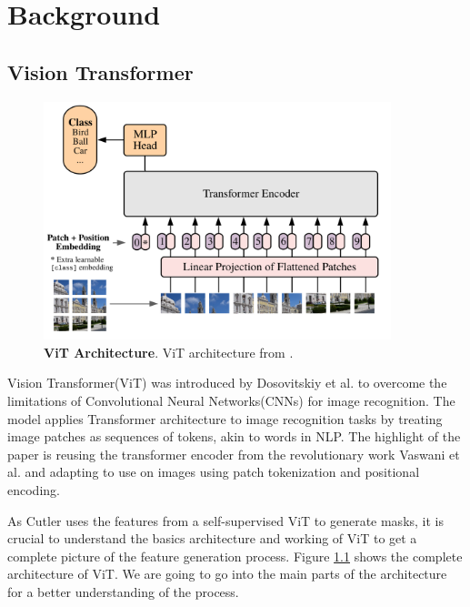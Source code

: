 \chapter{Background}\label{chap:background}

\section{Vision Transformer}

\begin{figure}
	\centering
	\includegraphics[width=0.9\textwidth]{Images/main/vit_full_arch.png}
	\caption[\textbf{ViT Architecture}]{\textbf{ViT Architecture}. ViT architecture from \cite{dosovitskiy2020image}.}
	\label{fig:vit_full_arch}
\end{figure}

Vision Transformer(ViT) was introduced by Dosovitskiy et al. \cite{dosovitskiy2020image} to overcome the limitations of Convolutional Neural Networks(CNNs) for image recognition. The model applies Transformer architecture to image recognition tasks by treating image patches as sequences of tokens, akin to words in NLP. The highlight of the paper is reusing the transformer encoder from the revolutionary work Vaswani et al.\cite{vaswani2023attentionneed} and adapting to use on images using patch tokenization and positional encoding.

As Cutler uses the features from a self-supervised ViT to generate masks, it is crucial to understand the basics architecture and working of ViT to get a complete picture of the feature generation process. Figure \ref{fig:vit_full_arch} shows the complete architecture of ViT. We are going to go into the main parts of the architecture for a better understanding of the process.

